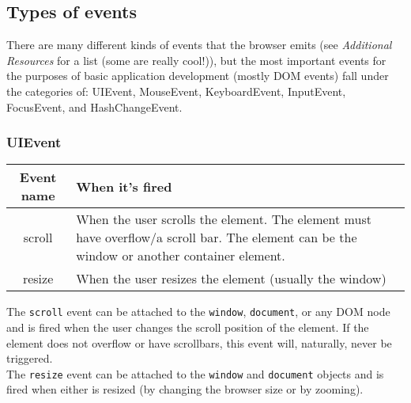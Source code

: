 \documentclass[12pt]{article}
\begin{document}
\subsection{Types of events}
There are many different kinds of events that the browser emits (see \emph{Additional Resources} for a list (some are really cool!)), but the most important events for the purposes of basic application development (mostly DOM events) fall under the categories of: UIEvent, MouseEvent, KeyboardEvent, InputEvent, FocusEvent, and HashChangeEvent.

\subsubsection*{UIEvent}
\begin{center}
  \begin{tabular}{| c | p{10.4cm} |}
    \hline
    \textbf{Event name} & \textbf{When it's fired} \\
    \hline
    scroll & When the user scrolls the element. The element
             must have overflow/a scroll bar. The element can be the window or another container element. \\
    \hline
    resize & When the user resizes the element (usually the
             window) \\
    \hline
  \end{tabular}
\end{center}
The \texttt{scroll} event can be attached to the \texttt{window}, \texttt{document}, or any DOM node and is fired when the user changes the scroll position of the element. If the element does not overflow or have scrollbars, this event will, naturally, never be triggered.
\\
The \texttt{resize} event can be attached to the \texttt{window} and \texttt{document} objects and is fired when either is resized (by changing the browser size or by zooming).
\end{document}
